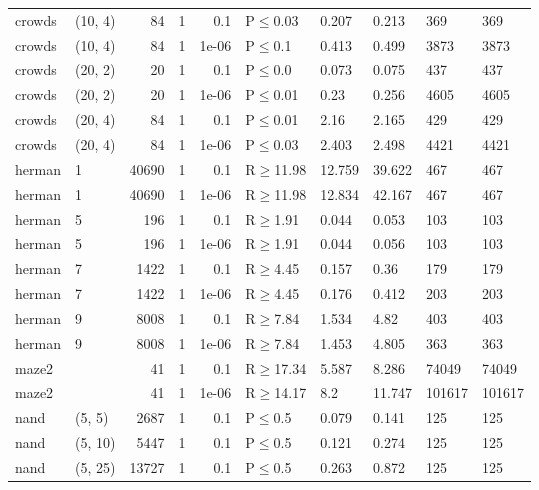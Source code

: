 \begin{longtable}{llrrrlllll}
 crowds        & (10, 4)   &     	84 & 1 & 0.1   & P$\leq$0.03  & 0.207  & 0.213   & 369    & 369    \\
 crowds        & (10, 4)   &     	84 & 1 & 1e-06 & P$\leq$0.1   & 0.413  & 0.499   & 3873   & 3873   \\
 crowds        & (20, 2)   &     	20 & 1 & 0.1   & P$\leq$0.0   & 0.073  & 0.075   & 437    & 437    \\
 crowds        & (20, 2)   &     	20 & 1 & 1e-06 & P$\leq$0.01  & 0.23   & 0.256   & 4605   & 4605   \\
 crowds        & (20, 4)   &     	84 & 1 & 0.1   & P$\leq$0.01  & 2.16   & 2.165   & 429    & 429    \\
 crowds        & (20, 4)   &     	84 & 1 & 1e-06 & P$\leq$0.03  & 2.403  & 2.498   & 4421   & 4421   \\
 herman        & 1         &  	40690 & 1 & 0.1   & R$\geq$11.98 & 12.759 & 39.622  & 467    & 467    \\
 herman        & 1         &  	40690 & 1 & 1e-06 & R$\geq$11.98 & 12.834 & 42.167  & 467    & 467    \\
 herman        & 5         &    	196 & 1 & 0.1   & R$\geq$1.91  & 0.044  & 0.053   & 103    & 103    \\
 herman        & 5         &    	196 & 1 & 1e-06 & R$\geq$1.91  & 0.044  & 0.056   & 103    & 103    \\
 herman        & 7         &   	1422 & 1 & 0.1   & R$\geq$4.45  & 0.157  & 0.36    & 179    & 179    \\
 herman        & 7         &   	1422 & 1 & 1e-06 & R$\geq$4.45  & 0.176  & 0.412   & 203    & 203    \\
 herman        & 9         &   	8008 & 1 & 0.1   & R$\geq$7.84  & 1.534  & 4.82    & 403    & 403    \\
 herman        & 9         &   	8008 & 1 & 1e-06 & R$\geq$7.84  & 1.453  & 4.805   & 363    & 363    \\
 maze2         &           &     	41 & 1 & 0.1   & R$\geq$17.34 & 5.587  & 8.286   & 74049  & 74049  \\
 maze2         &           &     	41 & 1 & 1e-06 & R$\geq$14.17 & 8.2    & 11.747  & 101617 & 101617 \\
 nand          & (5, 5)    &   	2687 & 1 & 0.1   & P$\leq$0.5   & 0.079  & 0.141   & 125    & 125    \\
 nand          & (5, 10)   &   	5447 & 1 & 0.1   & P$\leq$0.5   & 0.121  & 0.274   & 125    & 125    \\
 nand          & (5, 25)   &  	13727 & 1 & 0.1   & P$\leq$0.5   & 0.263  & 0.872   & 125    & 125    \\

\end{longtable}
